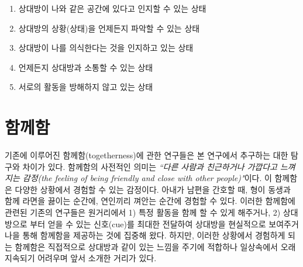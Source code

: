 \begin{center}
\begin{minipage}{.6\textwidth}
\begin{enumerate}[label=\Roman*., noitemsep]
	\item 상대방이 나와 같은 공간에 있다고 인지할 수 있는 상태
	\item 상대방의 상황(상태)을 언제든지 파악할 수 있는 상태
	\item 상대방이 나를 의식한다는 것을 인지하고 있는 상태
	\item 언제든지 상대방과 소통할 수 있는 상태
	\item 서로의 활동을 방해하지 않고 있는 상태
\end{enumerate}
\end{minipage}
\end{center}


\section{ 함께함}

기존에 이루어진 함께함(togetherness)에 관한 연구들은 본 연구에서 추구하는  대한 탐구와 차이가 있다. 함께함의 사전적인 의미는 \textit{``다른 사람과 친근하거나 가깝다고 느껴지는 감정(the feeling of being friendly and close with other people)"}이다\cite{def_togetherness}.
이 함께함은 다양한 상황에서 경험할 수 있는 감정이다. 아내가 남편을 간호할 때, 형이 동생과 함께 라면을 끓이는 순간에, 연인끼리 껴안는 순간에 경험할 수 있다. 
이러한 함께함에 관련된 기존의 연구들은 원거리에서 
1) 특정 활동을 함께 할 수 있게 해주거나\cite{flexNfeel}, 
2) 상대방으로 부터 얻을 수 있는 신호(cue)를 최대한 전달하여 상대방을 현실적으로 보여주거나\cite{orts2016holoportation, gibbs1999teleport}을 통해 함께함을 제공하는 것에 집중해 왔다.
하지만, 이러한 상황에서 경험하게 되는 함께함은 직접적으로 상대방과 같이 있는 느낌을 주기에 적합하나 일상속에서 오래 지속되기 어려우며 앞서 소개한  거리가 있다.



